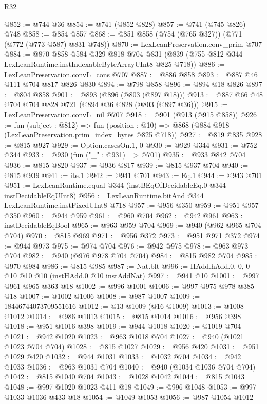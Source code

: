 \begin{lexlean}{R32}
\begin{coremodule}
@852 := @744 @36
@854 := @741 (@852 @828)
@857 := @741 (@745 @826) @748
@858 := @854 @857
@868 := @851 @858 (@754 (@765 @327)) (@771 (@772 (@773 @587) @831 @748))
@870 := LexLeanPreservation.conv_prim @707
@884 := @870
    @858
    @584
    @329
    @818
    @704
    @831
    (@839 (@755 @812 @344 LexLeanRuntime.instIndexableByteArrayUInt8 @825 @718))
@886 := LexLeanPreservation.convL_cons @707
@887 := @886 @858
@893 := @887 @46 @111 @704 @817 @826 @830
@894 := @798 @858
@896 := @894 @18 @826
@897 := @804 @858
@901 := @893 (@896 (@803 (@897 @18)))
@913 := @887 @66 @48 @704 @704 @828 @721 (@894 @36 @828 (@803 (@897 @36)))
@915 := LexLeanPreservation.convL_nil @707
@918 := @901 (@913 (@915 @858))
@926 := fun (subject : @812) =>
  fun (position : @10) => @868 (@884 @918 (LexLeanPreservation.prim_index_bytes @825 @718))
@927 := @819 @835
@928 := @815 @927
@929 := Option.casesOn.{1, 0}
@930 := @929 @344
@931 := @752 @344
@933 := @930 (fun ("_" : @931) => @701)
@935 := @933 @842 @704
@936 := @815 @820
@937 := @936 @817
@939 := @815 @937 @704
@940 := @815 @939
@941 := ite.{1}
@942 := @941 @701
@943 := Eq.{1}
@944 := @943 @701
@951 := LexLeanRuntime.equal @344 (instBEqOfDecidableEq.{0} @344 instDecidableEqUInt8)
@956 := LexLeanRuntime.bitAnd @344 LexLeanRuntime.instFixedUInt8 @718
@957 := @956 @350
@959 := @951 @957 @350
@960 := @944 @959
@961 := @960 @704
@962 := @942 @961
@963 := instDecidableEqBool
@965 := @963 @959 @704
@969 := @940 (@962 @965 @704 @704)
@970 := @815 @969
@971 := @956 @372
@973 := @951 @971 @372
@974 := @944 @973
@975 := @974 @704
@976 := @942 @975
@978 := @963 @973 @704
@982 := @940 (@976 @978 @704 @704)
@984 := @815 @982 @704
@985 := @970 @984
@986 := @815 @985
@987 := Nat.blt
@996 := HAdd.hAdd.{0, 0, 0} @10 @10 @10 (instHAdd.{0} @10 instAddNat)
@997 := @941 @10
@1001 := @997 @961 @965 @363 @18
@1002 := @996 @1001
@1006 := @997 @975 @978 @385 @18
@1007 := @1002 @1006
@1008 := @987 @1007
@1009 := 18446744073709551616
@1012 := @13 @1009 (@16 @1009)
@1013 := @1008 @1012
@1014 := @986 @1013
@1015 := @815 @1014
@1016 := @956 @398
@1018 := @951 @1016 @398
@1019 := @944 @1018
@1020 := @1019 @704
@1021 := @942 @1020
@1023 := @963 @1018 @704
@1027 := @940 (@1021 @1023 @704 @704)
@1028 := @815 @1027
@1029 := @956 @420
@1031 := @951 @1029 @420
@1032 := @944 @1031
@1033 := @1032 @704
@1034 := @942 @1033
@1036 := @963 @1031 @704
@1040 := @940 (@1034 @1036 @704 @704)
@1042 := @815 @1040 @704
@1043 := @1028 @1042
@1044 := @815 @1043
@1048 := @997 @1020 @1023 @411 @18
@1049 := @996 @1048
@1053 := @997 @1033 @1036 @433 @18
@1054 := @1049 @1053
@1056 := @987 @1054 @1012

\end{coremodule}
\end{lexlean}
